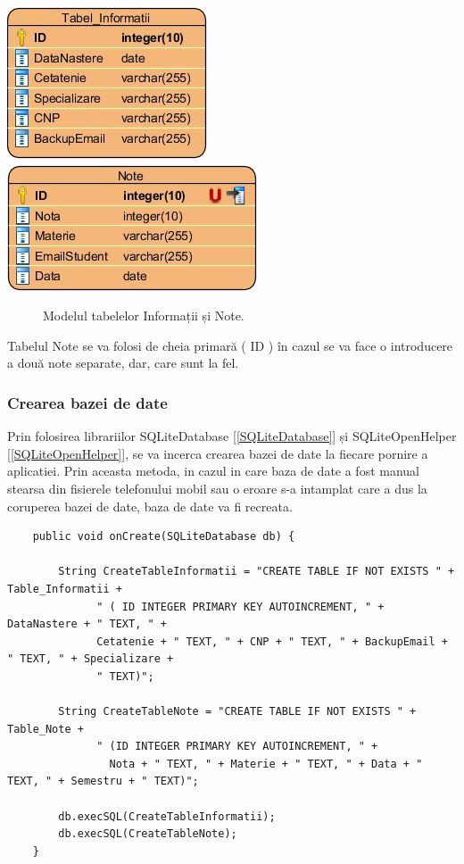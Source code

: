 \documentclass{article}
\begin{document}
	\begin{center}
		\includegraphics[scale=0.7]{Source/Informatii} 
		\includegraphics[scale=0.8]{Source/Note}
		\begin{figure}[!h]
			{\caption*{Modelul tabelelor Informații și Note.}}
		\end{figure}
	\end{center}

	Tabelul Note se va folosi de cheia primară ( ID ) în cazul se va face o introducere a două note separate, dar, care sunt la fel. 

		\subsubsection*{Crearea bazei de date}
	
		Prin folosirea librariilor SQLiteDatabase [\ref{SQLiteDatabase}] și SQLiteOpenHelper [\ref{SQLiteOpenHelper}], se va incerca crearea bazei de date la fiecare pornire a aplicatiei. Prin aceasta metoda, in cazul in care baza de date a fost manual stearsa din fisierele telefonului mobil sau o eroare s-a intamplat care a dus la coruperea bazei de date, baza de date va fi recreata. 

	\begin{verbatim}
    public void onCreate(SQLiteDatabase db) {

        String CreateTableInformatii = "CREATE TABLE IF NOT EXISTS " + Table_Informatii + 
              " ( ID INTEGER PRIMARY KEY AUTOINCREMENT, " + DataNastere + " TEXT, " + 
              Cetatenie + " TEXT, " + CNP + " TEXT, " + BackupEmail + " TEXT, " + Specializare + 
              " TEXT)";

        String CreateTableNote = "CREATE TABLE IF NOT EXISTS " + Table_Note + 
              " (ID INTEGER PRIMARY KEY AUTOINCREMENT, " +
                Nota + " TEXT, " + Materie + " TEXT, " + Data + " TEXT, " + Semestru + " TEXT)";

        db.execSQL(CreateTableInformatii);
        db.execSQL(CreateTableNote);
    }
	\end{verbatim}
	
\end{document}
